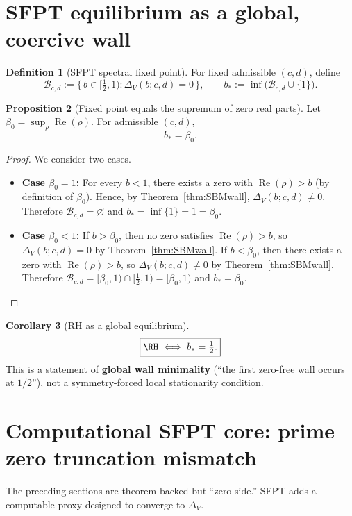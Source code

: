 \documentclass[11pt]{article}
\theoremstyle{definition}
\newtheorem{definition}{Definition}[section]
\newtheorem{proposition}[definition]{Proposition}
\newtheorem{corollary}[definition]{Corollary}
\newcommand{\ReB}{\operatorname{Re}}
\newcommand{\boxeq}{\boxed}
\begin{document}
\section{SFPT equilibrium as a global, coercive wall}

\begin{definition}[SFPT spectral fixed point]
For fixed admissible $(c,d)$, define
\[
\mathcal{B}_{c,d}
:=
\{\,b\in[\tfrac12,1):\Delta_V(b;c,d)=0\,\},
\qquad
\boxeq{b_*:=\inf\bigl(\mathcal{B}_{c,d}\cup\{1\}\bigr).}
\]
\end{definition}

\begin{proposition}[Fixed point equals the supremum of zero real parts]
Let $\beta_0=\sup_{\rho}\ReB(\rho)$. For admissible $(c,d)$,
\[
\boxeq{b_*=\beta_0.}
\]
\end{proposition}

\begin{proof}
We consider two cases.
\begin{itemize}
    \item \textbf{Case $\beta_0=1$:} For every $b<1$, there exists a zero with $\ReB(\rho)>b$ (by definition of $\beta_0$). Hence, by Theorem~\ref{thm:SBMwall}, $\Delta_V(b;c,d)\neq 0$. Therefore $\mathcal{B}_{c,d}=\varnothing$ and $b_*=\inf\{1\}=1=\beta_0$.
    \item \textbf{Case $\beta_0<1$:} If $b>\beta_0$, then no zero satisfies $\ReB(\rho)>b$, so $\Delta_V(b;c,d)=0$ by Theorem~\ref{thm:SBMwall}. If $b<\beta_0$, then there exists a zero with $\ReB(\rho)>b$, so $\Delta_V(b;c,d)\neq 0$ by Theorem~\ref{thm:SBMwall}. Therefore $\mathcal{B}_{c,d}=[\beta_0,1)\cap[\tfrac12,1)=[\beta_0,1)$ and $b_*=\beta_0$.
\end{itemize}
\end{proof}

\begin{corollary}[RH as a global equilibrium]
\[
\boxeq{\RH\iff b_*=\tfrac12.}
\]
This is a statement of \textbf{global wall minimality} (``the first zero-free wall occurs at $1/2$''), not a symmetry-forced local stationarity condition.
\end{corollary}

\section{Computational SFPT core: prime--zero truncation mismatch}
The preceding sections are theorem-backed but ``zero-side.'' SFPT adds a computable proxy designed to converge to $\Delta_V$.
\end{document}
